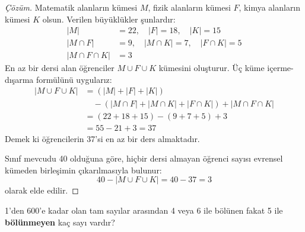 \begin{proof}[Çözüm]
Matematik alanların kümesi $M$, fizik alanların kümesi $F$, kimya alanların kümesi $K$
olsun. Verilen büyüklükler şunlardır: \begin{align*} |M| &= 22, \quad |F|
= 18, \quad |K| = 15 \\ |M \cap F| &= 9, \quad |M \cap K| = 7, \quad |F \cap K|
= 5 \\ |M \cap F \cap K| &= 3 \end{align*} En az bir dersi alan öğrenciler
$M \cup F \cup K$ kümesini oluşturur. Üç küme içerme-dışarma formülünü uygularız:
\begin{align*} |M \cup F \cup K| &= (|M| + |F| + |K|) \\ &\quad - (|M \cap F| + |M \cap K| + |F \cap K|) + |M \cap F \cap K| \\ &= (22 + 18 + 15) - (9 + 7 + 5) + 3 \\ &= 55 - 21 + 3 = 37 \end{align*} Demek ki öğrencilerin 37'si en az bir
ders almaktadır.

Sınıf mevcudu 40 olduğuna göre, hiçbir dersi almayan öğrenci sayısı evrensel
kümeden birleşimin çıkarılmasıyla bulunur: \[ 40 - |M \cup F \cup K| = 40 - 37
= 3 \] olarak elde edilir. \end{proof}

\begin{example} 1'den 600'e kadar olan tam sayılar arasından 4 veya 6 ile
bölünen fakat 5 ile \textbf{bölünmeyen} kaç sayı vardır? \end{example}

